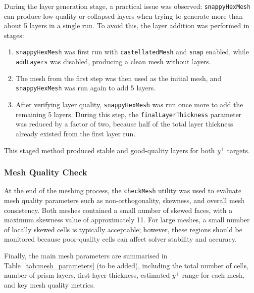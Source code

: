 During the layer generation stage, a practical issue was observed: \texttt{snappyHexMesh} can produce low-quality or collapsed layers when trying to generate more than about 5 layers in a single run. To avoid this, the layer addition was performed in stages:
\begin{enumerate}
    \item \texttt{snappyHexMesh} was first run with \texttt{castellatedMesh} and \texttt{snap} enabled, while \texttt{addLayers} was disabled, producing a clean mesh without layers.
    \item The mesh from the first step was then used as the initial mesh, and \texttt{snappyHexMesh} was run again to add 5 layers.
    \item After verifying layer quality, \texttt{snappyHexMesh} was run once more to add the remaining 5 layers. During this step, the \texttt{finalLayerThickness} parameter was reduced by a factor of two, because half of the total layer thickness already existed from the first layer run.
\end{enumerate}
This staged method produced stable and good-quality layers for both $y^+$ targets.

\subsubsection{Mesh Quality Check}
At the end of the meshing process, the \texttt{checkMesh} utility was used to evaluate mesh quality parameters such as non-orthogonality, skewness, and overall mesh consistency. Both meshes contained a small number of skewed faces, with a maximum skewness value of approximately 11. For large meshes, a small number of locally skewed cells is typically acceptable; however, these regions should be monitored because poor-quality cells can affect solver stability and accuracy.

Finally, the main mesh parameters are summarised in Table~\ref{tab:mesh_parameters} (to be added), including the total number of cells, number of prism layers, first-layer thickness, estimated $y^+$ range for each mesh, and key mesh quality metrics.

